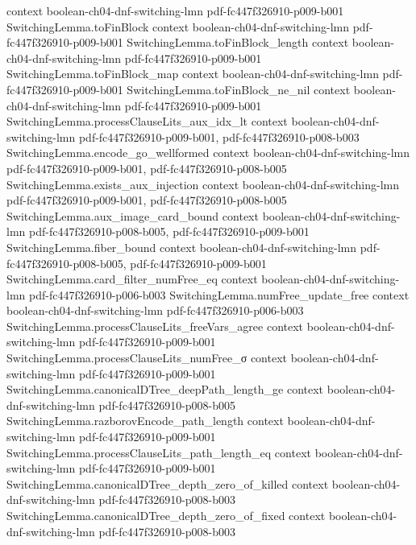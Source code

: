 \begin{theorem}
  {context}
  {boolean-ch04-dnf-switching-lmn}
  {pdf-fc447f326910-p009-b001}
\proofstep
  {SwitchingLemma.toFinBlock}
  {context}
  {boolean-ch04-dnf-switching-lmn}
  {pdf-fc447f326910-p009-b001}
\proofstep
  {SwitchingLemma.toFinBlock_length}
  {context}
  {boolean-ch04-dnf-switching-lmn}
  {pdf-fc447f326910-p009-b001}
\proofstep
  {SwitchingLemma.toFinBlock_map}
  {context}
  {boolean-ch04-dnf-switching-lmn}
  {pdf-fc447f326910-p009-b001}
\proofstep
  {SwitchingLemma.toFinBlock_ne_nil}
  {context}
  {boolean-ch04-dnf-switching-lmn}
  {pdf-fc447f326910-p009-b001}
\proofstep
  {SwitchingLemma.processClauseLits_aux_idx_lt}
  {context}
  {boolean-ch04-dnf-switching-lmn}
  {pdf-fc447f326910-p009-b001,
    pdf-fc447f326910-p008-b003}
\proofstep
  {SwitchingLemma.encode_go_wellformed}
  {context}
  {boolean-ch04-dnf-switching-lmn}
  {pdf-fc447f326910-p009-b001,
    pdf-fc447f326910-p008-b005}
\proofstep
  {SwitchingLemma.exists_aux_injection}
  {context}
  {boolean-ch04-dnf-switching-lmn}
  {pdf-fc447f326910-p009-b001,
    pdf-fc447f326910-p008-b005}
\proofstep
  {SwitchingLemma.aux_image_card_bound}
  {context}
  {boolean-ch04-dnf-switching-lmn}
  {pdf-fc447f326910-p008-b005,
    pdf-fc447f326910-p009-b001}
\proofstep
  {SwitchingLemma.fiber_bound}
  {context}
  {boolean-ch04-dnf-switching-lmn}
  {pdf-fc447f326910-p008-b005,
    pdf-fc447f326910-p009-b001}
\proofstep
  {SwitchingLemma.card_filter_numFree_eq}
  {context}
  {boolean-ch04-dnf-switching-lmn}
  {pdf-fc447f326910-p006-b003}
\proofstep
  {SwitchingLemma.numFree_update_free}
  {context}
  {boolean-ch04-dnf-switching-lmn}
  {pdf-fc447f326910-p006-b003}
\proofstep
  {SwitchingLemma.processClauseLits_freeVars_agree}
  {context}
  {boolean-ch04-dnf-switching-lmn}
  {pdf-fc447f326910-p009-b001}
\proofstep
  {SwitchingLemma.processClauseLits_numFree_σ}
  {context}
  {boolean-ch04-dnf-switching-lmn}
  {pdf-fc447f326910-p009-b001}
\proofstep
  {SwitchingLemma.canonicalDTree_deepPath_length_ge}
  {context}
  {boolean-ch04-dnf-switching-lmn}
  {pdf-fc447f326910-p008-b005}
\proofstep
  {SwitchingLemma.razborovEncode_path_length}
  {context}
  {boolean-ch04-dnf-switching-lmn}
  {pdf-fc447f326910-p009-b001}
\proofstep
  {SwitchingLemma.processClauseLits_path_length_eq}
  {context}
  {boolean-ch04-dnf-switching-lmn}
  {pdf-fc447f326910-p009-b001}
\proofstep
  {SwitchingLemma.canonicalDTree_depth_zero_of_killed}
  {context}
  {boolean-ch04-dnf-switching-lmn}
  {pdf-fc447f326910-p008-b003}
\proofstep
  {SwitchingLemma.canonicalDTree_depth_zero_of_fixed}
  {context}
  {boolean-ch04-dnf-switching-lmn}
  {pdf-fc447f326910-p008-b003}

\end{theorem}

